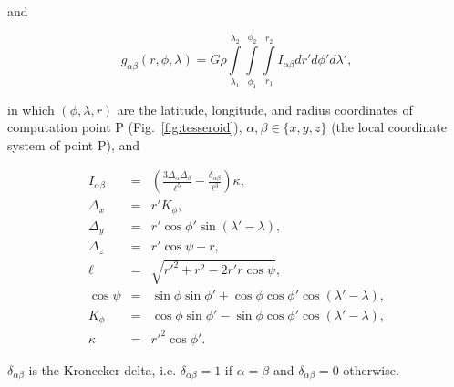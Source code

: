 \documentclass[extra]{gji}
\begin{document}
\noindent
and

\begin{equation}
    g_{\alpha\beta}(r,\phi,\lambda) = G \rho
        \int\limits_{\lambda_1}^{\lambda_2}
        \int\limits_{\phi_1}^{\phi_2}
        \int\limits_{r_1}^{r_2}
        I_{\alpha\beta}
        dr' d\phi' d\lambda',
    \label{eq:tesstensor}
\end{equation}

\noindent
in which
$(\phi, \lambda, r)$ are
the latitude, longitude, and radius
coordinates of computation point P (Fig.~\ref{fig:tesseroid}),
$\alpha,\beta \in \{x,y,z\}$
(the local coordinate system of point P),
and

\begin{eqnarray}
    I_{\alpha\beta} &=&
        \left(
            \frac{3\Delta_{\alpha} \Delta_{\beta}}{\ell^5} -
            \frac{\delta_{\alpha\beta}}{\ell^3}
        \right) \kappa, \\
    \Delta_x &=& r' K_{\phi} , \\
    \Delta_y &=& r' \cos \phi' \sin(\lambda' - \lambda) , \\
    \Delta_z &=& r' \cos \psi - r, \\
    \ell &=& \sqrt{r'^2 + r^2 - 2 r' r \cos \psi} , \\
    \cos\psi &=& \sin\phi\sin\phi' + \cos\phi\cos\phi'
                 \cos(\lambda' - \lambda) , \\
    K_{\phi} &=& \cos\phi\sin\phi' - \sin\phi\cos\phi'
                 \cos(\lambda' - \lambda), \\
    \kappa &=& {r'}^2 \cos \phi'.
\end{eqnarray}

\noindent
$\delta_{\alpha\beta}$ is the Kronecker delta,
i.e. $\delta_{\alpha\beta}=1$ if $\alpha=\beta$
and $\delta_{\alpha\beta}=0$ otherwise.
\end{document}
